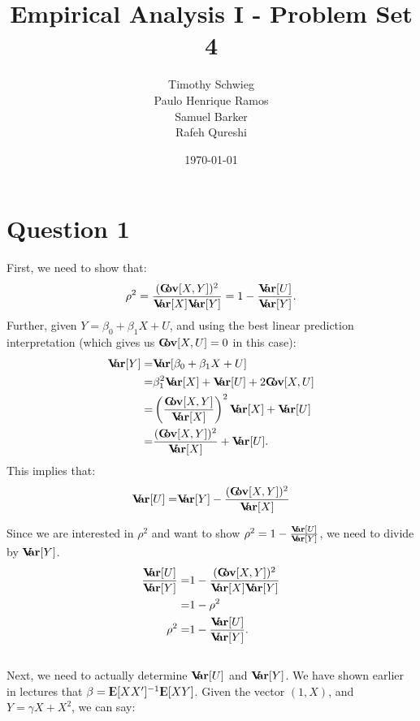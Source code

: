 \documentclass[12pt]{paper}
\newcommand{\E}{{\rm I\kern-.3em E}}
\newcommand{\Var}{{\rm \textbf{V\kern-.3em ar}}}
\newcommand{\Cov}{{\rm \textbf{C\kern-.3em ov}}}
\begin{document}
\author{
{Timothy Schwieg}\\
{Paulo Henrique Ramos}\\
{Samuel Barker}\\
{Rafeh Qureshi}
}

\date{\today}
\title{Empirical Analysis I -  Problem Set 4}


\maketitle

\section*{Question 1}
First, we need to show that:
\begin{align*}
\rho^2=\frac{(\Cov[X,Y])^2}{\Var[X]\Var[Y]}=1-\frac{\Var[U]}{\Var[Y]}.
\end{align*}
Further, given $Y=\beta_0+\beta_1 X+U$, and using the best linear prediction interpretation (which gives us $\Cov[X,U]=0$ in this case):
\begin{align*}
\Var[Y]=&\Var[\beta_0+\beta_1 X+U]\\
=& \beta_1^2 \Var[X]+\Var[U]+2\Cov[X,U]\\
=& \left( \frac{\Cov[X,Y]}{\Var[X]} \right)^2\Var[X]+\Var[U]\\
=&  \frac{(\Cov[X,Y])^2}{\Var[X]}+\Var[U].
\end{align*}
This implies that:
\begin{align*}
\Var[U]=& \Var[Y]-\frac{(\Cov[X,Y])^2}{\Var[X]}\\
\end{align*}

Since we are interested in $\rho^2$ and want to show $\rho^2=1-\frac{\Var[U]}{\Var[Y]}$, we need to divide by $\Var[Y]$.
\begin{align*}
\frac{\Var[U]}{\Var[Y]}=& 1-\frac{(\Cov[X,Y])^2}{\Var[X]\Var[Y]}\\
=& 1-\rho^2\\
\rho^2=& 1-\frac{\Var[U]}{\Var[Y]}.
\end{align*}\\


Next, we need to actually determine $\Var[U]$ and $\Var[Y]$. We have shown earlier in lectures that $\beta=\E[XX']^{-1}\E[XY]$. Given the vector $(1,X)$, and $Y=\gamma X + X^2$, we can say:
\end{document}
